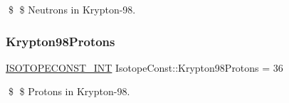 \$ \$ Neutrons in Krypton-\/98. \mbox{\label{group___isotope_const-_krypton-_kr98_ga4755659f878dd57ca39ea2f329eae009}} 
\subsubsection{\texorpdfstring{Krypton98\+Protons}{Krypton98Protons}}
{\footnotesize\ttfamily \mbox{\hyperlink{group___isotope_const-_macros_ga5f18360b3e99483a35c32d789e62621c}{I\+S\+O\+T\+O\+P\+E\+C\+O\+N\+S\+T\+\_\+\+I\+NT}} Isotope\+Const\+::\+Krypton98\+Protons = 36}

\$ \$ Protons in Krypton-\/98. 